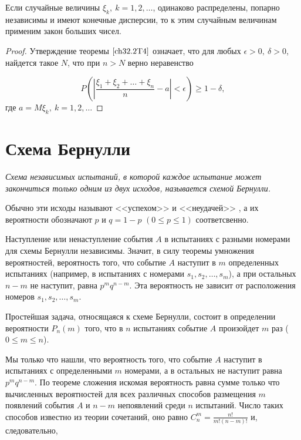 \begin{thm} \label{ch32.2T4}
Если случайные величины $\xi_k, \: k = 1,2,\ldots$, одинаково распределены, попарно независимы и имеют конечные дисперсии, то к этим случайным величинам применим закон больших чисел.
\end{thm}

\begin{proof}
Утверждение теоремы $\ref{ch32.2T4}$ означает, что для любых $\epsilon > 0, \: \delta > 0$, найдется такое $N$, что при $n > N$ верно неравенство

\begin{equation} \label{ch32.2eq6}
P \left( \left| \frac{\xi_1 + \xi_2 + \ldots + \xi_n}{n} - a \right| < \epsilon \right) \ge 1 - \delta,
\end{equation}
где $a = M  \xi_k, \: k = 1, 2, \ldots$
\end{proof}

\section{Схема Бернулли}

\textit{Схема независимых испытаний, в которой каждое испытание может закончиться только одним из двух исходов, называется схемой Бернулли.}

Обычно эти исходы называют <<успехом>> и <<неудачей>> , а их вероятности обозначают $p$ и $q = 1 - p$ $(0 \le p \le 1)$ соответсвенно.

Наступление или ненаступление события $A$ в испытаниях с разными номерами для схемы Бернулли независимы. Значит, в силу теоремы умножения вероятностей, вероятность того, что событие $A$ наступит в $m$ определенных испытаниях (например, в испытаниях с номерами $s_1, s_2, \ldots, s_m$), а при остальных $n - m$ не наступит, равна $p^mq^{n - m}$. Эта вероятность не зависит от  расположения номеров $s_1, s_2, \ldots, s_m$.

Простейшая задача, относящаяся к схеме Бернулли, состоит в определении вероятности $P_n(m)$ того, что в $n$ испытаниях событие $A$ произойдет $m$ раз ($0 \le m \le n$).

Мы только что нашли, что вероятность того, что событие $A$ наступит в испытаниях с определенными $m$ номерами, а в остальных не наступит равна $p^mq^{n - m}$. По теореме сложения искомая вероятность равна сумме только что вычисленных вероятностей для всех различных способов размещения $m$ появлений события $A$ и $n - m$ непоявлений среди $n$ испытаний. Число таких способов известно из теории сочетаний, оно равно 	$C_n^m = \frac{n!}{m!(n - m)!}$ и, следовательно,
 
